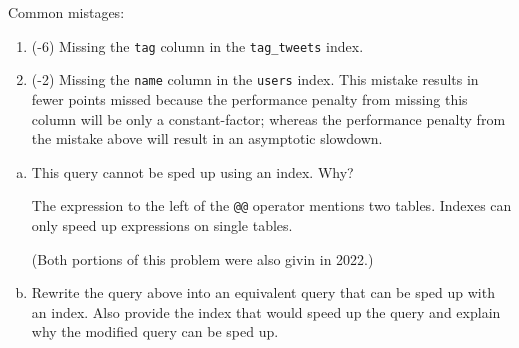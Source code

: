 \documentclass[12pt]{exam}
\theoremstyle{definition}
\begin{document}
\begin{questions}
\begin{solution}
    Common mistages:
    \begin{enumerate}
        \item (-6) Missing the \lstinline{tag} column in the \lstinline{tag_tweets} index.
        \item (-2) Missing the \lstinline{name} column in the \lstinline{users} index.
            This mistake results in fewer points missed because the performance penalty from missing this column will be only a constant-factor; whereas the performance penalty from the mistake above will result in an asymptotic slowdown.
    \end{enumerate}

\end{solution}

\newpage
{}

\begin{enumerate}[a.]
    \item This query cannot be sped up using an index.  Why?

        \begin{solution}
            The expression to the left of the \lstinline{@@} operator mentions two tables.
            Indexes can only speed up expressions on single tables.

            (Both portions of this problem were also givin in 2022.)
        \end{solution}

        \newpage
    \item Rewrite the query above into an equivalent query that can be sped up with an index.  Also provide the index that would speed up the query and explain why the modified query can be sped up.


\end{enumerate}
\end{questions}
\end{document}
